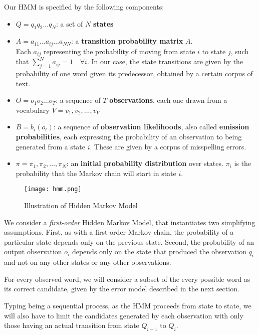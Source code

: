 Our HMM is specified by the following components:
\begin{itemize}
	\item $Q = q_1q_2 \dots q_N$: a set of $N$ \textbf{states}
	\item $A=a_{11}	\dots a_{ij} \dots a_{NN}$: a \textbf{transition probability matrix} $A$. \\ Each $a_{ij}$ 
	representing the probability of moving from state $i$ to state $j$, such that $\sum_{j=1}^N a_{ij}=1 \quad 
	\forall i$. In our case, the state transitions are given by the probability of one word given its predecessor, 
	obtained by a certain corpus of text.
	\item $O = o_1o_2 \dots o_T$: a sequence of $T$ \textbf{observations}, each one drawn from a vocabulary 
	$V = v_1,v_2,\dots,v_V$
	\item $B = b_i (o_t )$: a sequence of \textbf{observation likelihoods}, also called \textbf{emission 
		probabilities}, each expressing the probability of an observation to being generated from a state $i$. These 
	are given by a corpus of misspelling errors.
	\item $\pi = \pi_1,\pi_2,\dots,\pi_N$: an \textbf{initial probability distribution} over states. $\pi_i$ is the 
	probability that the Markov chain will start in state $i$. 
\end{itemize}


\begin{figure}[H]
	\centering
	\texttt{[image: hmm.png]}
	\caption{Illustration of Hidden Markov Model}
	\label{fig:hmm}
\end{figure}

We consider a \textit{first-order} Hidden Markov Model, that instantiates two simplifying assumptions. First, as 
with a first-order Markov chain, the probability of a particular state depends only on the previous state. Second, 
the probability of an output observation $o_i$ depends only on the state that produced the observation $q_i$ 
and not on any other states or any other observations.

For every observed word, we will consider a subset of the every possible word as its correct candidate, given by 
the error model described in the next section.

Typing being a sequential process, as the HMM proceeds from state to state, we will also have to limit the 
candidates generated by each observation with only those having an actual transition from state $Q_{i-1}$ to 
$Q_i$.

